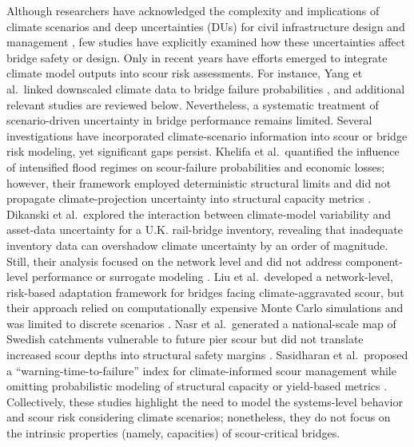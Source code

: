 \documentclass[authoryear,preprint,review,12pt]{elsarticle}
\begin{document}
Although researchers have acknowledged the complexity and implications of climate scenarios and deep uncertainties (DUs) for civil infrastructure design and management \citep{helmrich2022reconciling}, few studies have explicitly examined how these uncertainties affect bridge safety or design. Only in recent years have efforts emerged to integrate climate model outputs into scour risk assessments. For instance, Yang et al.\ linked downscaled climate data to bridge failure probabilities \citep{Yang2019}, and additional relevant studies are reviewed below. Nevertheless, a systematic treatment of scenario-driven uncertainty in bridge performance remains limited. Several investigations have incorporated climate-scenario information into scour or bridge risk modeling, yet significant gaps persist. Khelifa et al.\ quantified the influence of intensified flood regimes on scour-failure probabilities and economic losses; however, their framework employed deterministic structural limits and did not propagate climate-projection uncertainty into structural capacity metrics \citep{Khelifa2013}. Dikanski et al.\ explored the interaction between climate-model variability and asset-data uncertainty for a U.K. rail-bridge inventory, revealing that inadequate inventory data can overshadow climate uncertainty by an order of magnitude. Still, their analysis focused on the network level and did not address component-level performance or surrogate modeling \citep{Dikanski2018}. Liu et al.\ developed a network-level, risk-based adaptation framework for bridges facing climate-aggravated scour, but their approach relied on computationally expensive Monte Carlo simulations and was limited to discrete scenarios \citep{Liu2020}. Nasr et al.\ generated a national-scale map of Swedish catchments vulnerable to future pier scour but did not translate increased scour depths into structural safety margins \citep{Nasr2023}. Sasidharan et al.\ proposed a “warning-time-to-failure” index for climate-informed scour management while omitting probabilistic modeling of structural capacity or yield-based metrics \citep{Sasidharan2023}. Collectively, these studies highlight the need to model the systems-level behavior and scour risk considering climate scenarios; nonetheless, they do not focus on the intrinsic properties (namely, capacities) of scour-critical bridges. 
\end{document}
